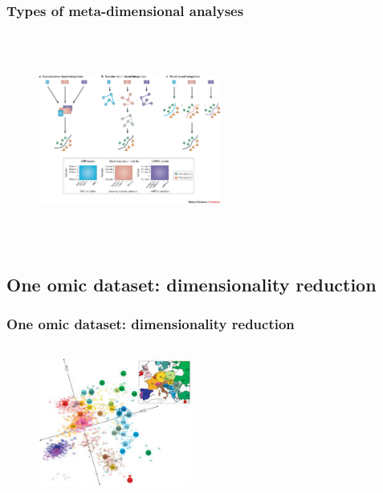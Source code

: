 \documentclass[10pt,xcolor=dvipsnames]{beamer}\usepackage[]{graphicx}\usepackage[]{color}
\begin{document}
\begin{frame}\frametitle{Types of meta-dimensional analyses}

\begin{figure}
\begin{center}
 \includegraphics[height=7cm, width=6cm]{figures/meta_dimensional.jpg}
\end{center}
\end{figure}

\end{frame}







\subsection{One omic dataset: dimensionality reduction}



\begin{frame}\frametitle{One omic dataset: dimensionality reduction}

\begin{figure}
\begin{center}
 \includegraphics[height=5cm, width=5cm]{figures/pca_example.jpg}
\end{center}
\end{figure}

\end{frame}
\end{document}
